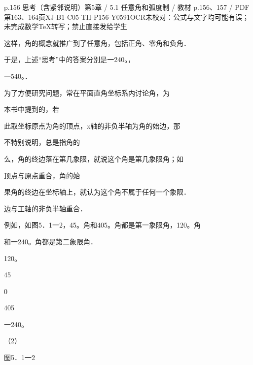 \begin{bankitem}{p.156 思考（含紧邻说明）}{第5章 / 5.1 任意角和弧度制 / 教材 p.156、157 / PDF 第163、164页}{XJ-B1-C05-TH-P156-Y0591}{OCR未校对：公式与文字均可能有误；未完成数学TeX转写；禁止直接发给学生}
\begin{ocrdraft}
\par
这样，角的概念就推广到了任意角，包括正角、零角和负角．
\par
于是，上述“思考”中的答案分别是一240。，
\par
一540。．
\par
为了方便研究问题，常在平面直角坐标系内讨论角，为
\par
本书中提到的，若
\par
此取坐标原点为角的顶点，x轴的非负半轴为角的始边，那
\par
不特别说明，总是指角的
\par
么，角的终边落在第几象限，就说这个角是第几象限角；如
\par
顶点与原点重合，角的始
\par
果角的终边在坐标轴上，就认为这个角不属于任何一个象限．
\par
边与工轴的非负半轴重合．
\par
例如，如图5．1一2，45。角和405。角都是第一象限角，120。角
\par
[教材p.157 / PDF第164页]
\par
和一240。角都是第二象限角．
\par
120。
\par
45
\par
0
\par
405
\par
一240。
\par
（2）
\par
图5．1一2
\end{ocrdraft}
\end{bankitem}
